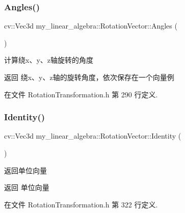 \subsubsection{\texorpdfstring{Angles()}{Angles()}}
{\footnotesize\ttfamily cv\+::\+Vec3d my\+\_\+linear\+\_\+algebra\+::\+Rotation\+Vector\+::\+Angles (\begin{DoxyParamCaption}{ }\end{DoxyParamCaption})\hspace{0.3cm}{\ttfamily [inline]}}



计算绕x、y、z轴旋转的角度 

\begin{DoxyReturn}{返回}
绕x、y、z轴的旋转角度，依次保存在一个向量例 
\end{DoxyReturn}


在文件 Rotation\+Transformation.\+h 第 290 行定义.

\mbox{\label{classmy__linear__algebra_1_1_rotation_vector_acedbea80938f859a4c9e76b2c51d9300}} 
\subsubsection{\texorpdfstring{Identity()}{Identity()}}
{\footnotesize\ttfamily cv\+::\+Vec3d my\+\_\+linear\+\_\+algebra\+::\+Rotation\+Vector\+::\+Identity (\begin{DoxyParamCaption}{ }\end{DoxyParamCaption})\hspace{0.3cm}{\ttfamily [inline]}}



返回单位向量 

\begin{DoxyReturn}{返回}
单位向量 
\end{DoxyReturn}


在文件 Rotation\+Transformation.\+h 第 322 行定义.

\mbox{\label{classmy__linear__algebra_1_1_rotation_vector_ab319f77efd3cb7205a07132513f62942}} 
